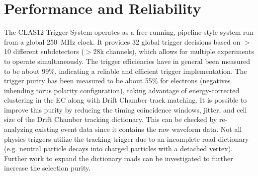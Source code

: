 \section{Performance and Reliability}

The CLAS12 Trigger System operates as a free-running, pipeline-style system run from a global 250~MHz clock. It provides 32 global trigger decisions based on $>$10 different subdetectors ($>$28k channels), which allows for multiple experiments to operate simultaneously. The trigger efficiencies have in general been measured to be about 99\%, indicating a reliable and efficient trigger implementation. The trigger purity has been measured to be about 55\% for electrons (negatives inbending torus polarity configuration), taking advantage of energy-corrected clustering in the EC along with Drift Chamber track matching. It is possible to improve this purity by reducing the timing coincidence windows, jitter, and cell size of the Drift Chamber tracking dictionary. This can be checked by re-analyzing existing event data since it contains the raw waveform data. Not all physics triggers utilize the tracking trigger due to an incomplete road dictionary (e.g. neutral particle decays into charged particles with a detached vertex). Further work to expand the dictionary roads can be investigated to further increase the selection purity.
